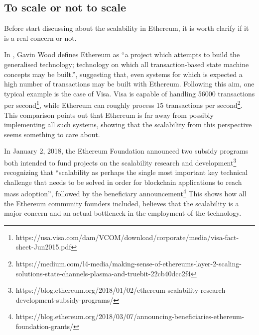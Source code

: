 \subsection{To scale or not to scale}

Before start discussing about the scalability in Ethereum, it is worth clarify
if it is a real concern or not.

In \cite{wood2018ethereum}, Gavin Wood defines Ethereum as ``a project which
attempts to build the generalised technology; technology on which all
transaction-based state machine concepts may be built.'', suggesting that, even
systems for which is expected a high number of transactions may be built with
Ethereum. Following this aim, one typical example is the case of Visa. Visa is
capable of handling 56000 transactions per
second\footnote{https://usa.visa.com/dam/VCOM/download/corporate/media/visa-fact-sheet-Jun2015.pdf},
while Ethereum can roughly process 15 transactions per
second\footnote{https://medium.com/l4-media/making-sense-of-ethereums-layer-2-scaling-solutions-state-channels-plasma-and-truebit-22cb40dcc2f4}.
This comparison points out that Ethereum is far away from possibly implementing
all such systems, showing that the scalability from this perspective seems
something to care about.

In January 2, 2018, the Ethereum Foundation announced two subsidy programs both
intended to fund projects on the scalability research and
development\footnote{https://blog.ethereum.org/2018/01/02/ethereum-scalability-research-development-subsidy-programs/}
recognizing that ``scalability as perhaps the single most important key
technical challenge that needs to be solved in order for blockchain applications
to reach mass adoption'', followed by the beneficiary
announcement\footnote{https://blog.ethereum.org/2018/03/07/announcing-beneficiaries-ethereum-foundation-grants/}
This shows how all the Ethereum community founders included, believes that the
scalability is a major concern and an actual bottleneck in the employment of the
technology.
